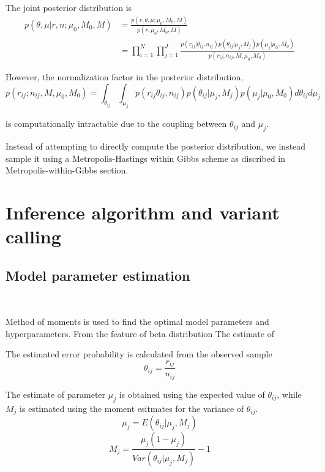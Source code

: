 \documentclass[11pt,reqno]{amsart}
\begin{document}
The joint posterior distribution is
\begin{equation}
\begin{split}
 p(\theta, \mu | r,n; \mu_0,M_0,M) &= \frac{p(r,\theta,\mu;\mu_0,M_0,M)}{p(r;\mu_0,M_0,M)}\\
 & = \prod_{i=1}^N\prod_{j=1}^J\frac{p(r_{ij}|\theta_{ij},n_{ij})p(\theta_{ij}|\mu_j,M_j)p(\mu_j|\mu_0,M_0)}{p(r_{ij};n_{ij},M,\mu_0,M_0)}
\end{split} 
\end{equation}

However, the normalization factor in the posterior distribution,
\begin{equation}
 {p(r_{ij};n_{ij},M,\mu_0,M_0)}=\int_{\theta_{ij}}\int_{\mu_j}p(r_{ij}\theta_{ij},n_{ij})p(\theta_{ij}|\mu_j,M_j)p(\mu_j|\mu_0,M_0)d\theta_{ij}d\mu_j
\end{equation}

is computationally intractable due to the coupling between $\theta_{ij}$ and $\mu_j$.

Instead of attempting to directly compute the posterior distribution, we instead sample it using a Metropolis-Hastings within Gibbs scheme as discribed in Metropolis-within-Gibbs section.

\section{Inference algorithm and variant calling}
\subsection{Model parameter estimation}\

Method of moments is used to find the optimal model parameters and hyperparameters. From the feature of beta distribution
The estimate of 

The estimated error probability is calculated from the observed sample
\begin{equation}
 \theta_{ij}=\frac{r_{ij}}{n_{ij}}
\end{equation}

The estimate of parameter $\mu_j$ is obtained using the expected value of $\theta_{ij}$, while $M_j$ is estimated using the moment esitmates for the variance of $\theta_{ij}$.
\begin{equation}
 \mu_j=E(\theta_{ij}|\mu_j,M_j)
\end{equation}
\begin{equation}
 M_j=\frac{\mu_j(1-\mu_j)}{Var(\theta_{ij}|\mu_j,M_j)}-1
\end{equation}
\end{document}
